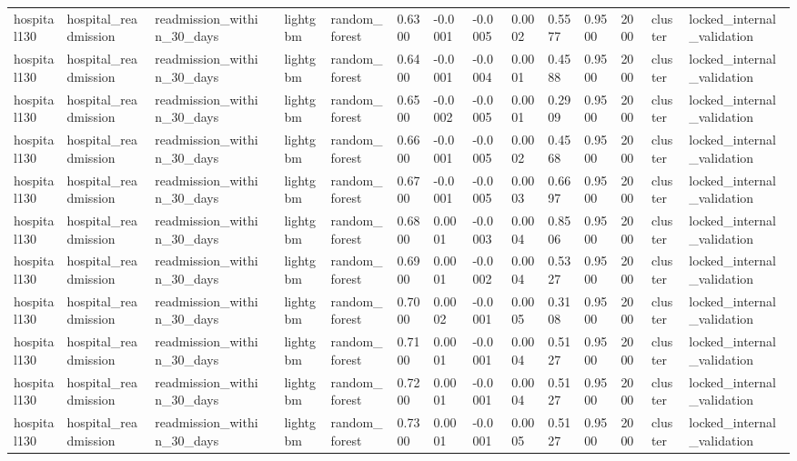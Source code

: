\begin{tabular}{lllllllllllllll}
hospital130 & hospital\_readmission & readmission\_within\_30\_days &  & lightgbm & random\_forest & 0.6300 & -0.0001 & -0.0005 & 0.0002 & 0.5577 & 0.9500 & 2000 & cluster & locked\_internal\_validation \\
hospital130 & hospital\_readmission & readmission\_within\_30\_days &  & lightgbm & random\_forest & 0.6400 & -0.0001 & -0.0004 & 0.0001 & 0.4588 & 0.9500 & 2000 & cluster & locked\_internal\_validation \\
hospital130 & hospital\_readmission & readmission\_within\_30\_days &  & lightgbm & random\_forest & 0.6500 & -0.0002 & -0.0005 & 0.0001 & 0.2909 & 0.9500 & 2000 & cluster & locked\_internal\_validation \\
hospital130 & hospital\_readmission & readmission\_within\_30\_days &  & lightgbm & random\_forest & 0.6600 & -0.0001 & -0.0005 & 0.0002 & 0.4568 & 0.9500 & 2000 & cluster & locked\_internal\_validation \\
hospital130 & hospital\_readmission & readmission\_within\_30\_days &  & lightgbm & random\_forest & 0.6700 & -0.0001 & -0.0005 & 0.0003 & 0.6697 & 0.9500 & 2000 & cluster & locked\_internal\_validation \\
hospital130 & hospital\_readmission & readmission\_within\_30\_days &  & lightgbm & random\_forest & 0.6800 & 0.0001 & -0.0003 & 0.0004 & 0.8506 & 0.9500 & 2000 & cluster & locked\_internal\_validation \\
hospital130 & hospital\_readmission & readmission\_within\_30\_days &  & lightgbm & random\_forest & 0.6900 & 0.0001 & -0.0002 & 0.0004 & 0.5327 & 0.9500 & 2000 & cluster & locked\_internal\_validation \\
hospital130 & hospital\_readmission & readmission\_within\_30\_days &  & lightgbm & random\_forest & 0.7000 & 0.0002 & -0.0001 & 0.0005 & 0.3108 & 0.9500 & 2000 & cluster & locked\_internal\_validation \\
hospital130 & hospital\_readmission & readmission\_within\_30\_days &  & lightgbm & random\_forest & 0.7100 & 0.0001 & -0.0001 & 0.0004 & 0.5127 & 0.9500 & 2000 & cluster & locked\_internal\_validation \\
hospital130 & hospital\_readmission & readmission\_within\_30\_days &  & lightgbm & random\_forest & 0.7200 & 0.0001 & -0.0001 & 0.0004 & 0.5127 & 0.9500 & 2000 & cluster & locked\_internal\_validation \\
hospital130 & hospital\_readmission & readmission\_within\_30\_days &  & lightgbm & random\_forest & 0.7300 & 0.0001 & -0.0001 & 0.0005 & 0.5127 & 0.9500 & 2000 & cluster & locked\_internal\_validation \\

\end{tabular}
